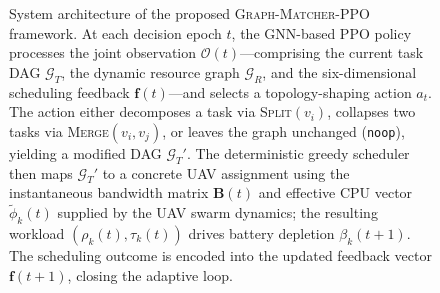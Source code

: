\begin{figure}[t]
\begin{tikzpicture}
\end{tikzpicture}%
\caption{%
  System architecture of the proposed \textsc{Graph-Matcher-PPO}
  framework.
  At each decision epoch $t$, the GNN-based PPO policy processes the
  joint observation $\mathcal{O}(t)$---comprising the current task DAG
  $\mathcal{G}_T$, the dynamic resource graph $\mathcal{G}_R$, and the
  six-dimensional scheduling feedback $\mathbf{f}(t)$---and selects a
  topology-shaping action $a_t$.
  The action either decomposes a task via \textsc{Split}$(v_i)$,
  collapses two tasks via \textsc{Merge}$(v_i, v_j)$, or leaves the
  graph unchanged (\texttt{noop}), yielding a modified DAG
  $\mathcal{G}_T'$.
  The deterministic greedy scheduler then maps $\mathcal{G}_T'$ to a
  concrete UAV assignment using the instantaneous bandwidth matrix
  $\mathbf{B}(t)$ and effective CPU vector $\tilde\phi_k(t)$ supplied
  by the UAV swarm dynamics; the resulting workload
  $(\rho_k(t), \tau_k(t))$ drives battery depletion
  $\beta_k(t{+}1)$.
  The scheduling outcome is encoded into the updated feedback vector
  $\mathbf{f}(t{+}1)$, closing the adaptive loop.%
}
\label{fig:framework}
\end{figure}
